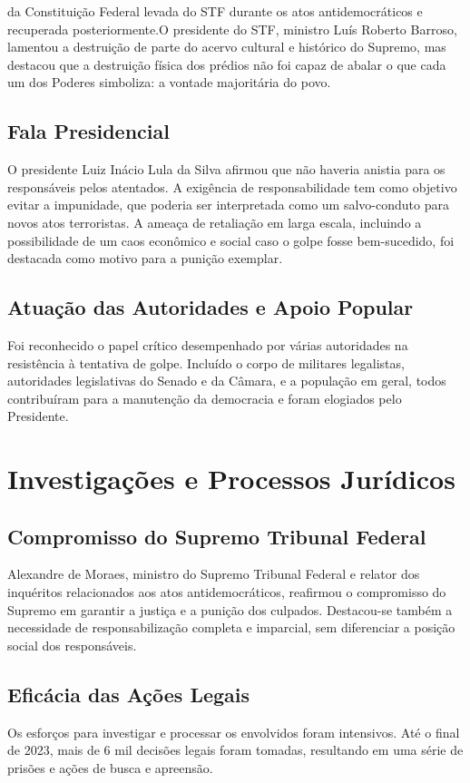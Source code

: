 \documentclass[
   article,       
   12pt,          
   oneside,       
   a4paper,       
   english,       
   brazil,        
   sumario=tradicional
   ]{abntex2}
\begin{document}
da Constituição Federal levada do STF durante os atos antidemocráticos e recuperada posteriormente.O presidente do STF, ministro Luís Roberto Barroso, lamentou a destruição de parte do acervo cultural e histórico do Supremo, mas destacou que a destruição física dos prédios não foi capaz de abalar o que cada um dos Poderes simboliza: a vontade majoritária do povo.


\subsection{Fala Presidencial}
O presidente Luiz Inácio Lula da Silva afirmou que não haveria anistia para os responsáveis pelos atentados. A exigência de responsabilidade tem como objetivo evitar a impunidade, que poderia ser interpretada como um salvo-conduto para novos atos terroristas. A ameaça de retaliação em larga escala, incluindo a possibilidade de um caos econômico e social caso o golpe fosse bem-sucedido, foi destacada como motivo para a punição exemplar.

\subsection{Atuação das Autoridades e Apoio Popular}
Foi reconhecido o papel crítico desempenhado por várias autoridades na resistência à tentativa de golpe. Incluído o corpo de militares legalistas, autoridades legislativas do Senado e da Câmara, e a população em geral, todos contribuíram para a manutenção da democracia e foram elogiados pelo Presidente.
\section{Investigações e Processos Jurídicos}

\subsection{Compromisso do Supremo Tribunal Federal}
Alexandre de Moraes, ministro do Supremo Tribunal Federal e relator dos inquéritos relacionados aos atos antidemocráticos, reafirmou o compromisso do Supremo em garantir a justiça e a punição dos culpados. Destacou-se também a necessidade de responsabilização completa e imparcial, sem diferenciar a posição social dos responsáveis.

\subsection{Eficácia das Ações Legais}
Os esforços para investigar e processar os envolvidos foram intensivos. Até o final de 2023, mais de 6 mil decisões legais foram tomadas, resultando em uma série de prisões e ações de busca e apreensão.
\end{document}
